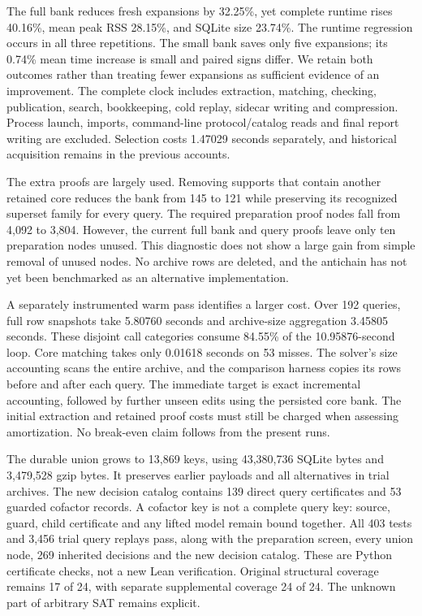 \documentclass[11pt,a4paper]{article}
\numberwithin{equation}{section}
\theoremstyle{plain}
\theoremstyle{definition}
\theoremstyle{remark}
\begin{document}
The full bank reduces fresh expansions by 32.25\%, yet complete runtime rises
40.16\%, mean peak RSS 28.15\%, and SQLite size 23.74\%. The runtime regression
occurs in all three repetitions. The small bank saves only five expansions;
its 0.74\% mean time increase is small and paired signs differ. We retain both
outcomes rather than treating fewer expansions as sufficient evidence of an
improvement. The complete clock includes extraction, matching, checking,
publication, search, bookkeeping, cold replay, sidecar writing and compression.
Process launch, imports, command-line protocol/catalog reads and final report
writing are excluded. Selection costs 1.47029 seconds separately, and historical acquisition remains in the previous accounts.

The extra proofs are largely used. Removing supports that contain another
retained core reduces the bank from 145 to 121 while preserving its recognized
superset family for every query. The required preparation proof nodes fall
from 4,092 to 3,804. However, the current full bank and query proofs leave only
ten preparation nodes unused. This diagnostic does not show a large gain from
simple removal of unused nodes. No archive rows are deleted, and the antichain
has not yet been benchmarked as an alternative implementation.

A separately instrumented warm pass identifies a larger cost. Over 192 queries,
full row snapshots take 5.80760 seconds and archive-size aggregation 3.45805
seconds. These disjoint call categories consume 84.55\% of the 10.95876-second
loop. Core matching takes only 0.01618 seconds on 53 misses. The solver's size
accounting scans the entire archive, and the comparison harness copies its rows
before and after each query. The immediate target is exact incremental
accounting, followed by further unseen edits using the persisted core bank.
The initial extraction and retained proof costs must still be charged when
assessing amortization. No break-even claim follows from the present runs.

The durable union grows to 13,869 keys, using 43,380,736 SQLite bytes and
3,479,528 gzip bytes. It preserves earlier payloads and all alternatives in
trial archives. The new decision catalog contains 139 direct query certificates
and 53 guarded cofactor records. A cofactor key is not a complete query key:
source, guard, child certificate and any lifted model remain bound together.
All 403 tests and 3,456 trial query replays pass, along with the preparation
screen, every union node, 269 inherited decisions and the new decision catalog.
These are Python certificate checks, not a new Lean verification. Original
structural coverage remains 17 of 24, with separate supplemental coverage 24
of 24. The unknown part of arbitrary SAT remains explicit.
\end{document}
